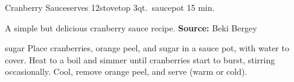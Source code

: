 \begin{recipe}{Cranberry Sauce}{serves 12}{stovetop \hfill 3qt.\ saucepot \hfill 15 min.}

 \freeform A simple but delicious cranberry sauce recipe.
 \textbf{Source:} Beki Bergey

  {sugar}
 Place cranberries, orange peel, and sugar in a sauce pot, with water to cover.
 \newstep Heat to a boil and simmer until cranberries start to burst, stirring occasionally.
 \newstep Cool, remove orange peel, and serve (warm or cold).

\end{recipe}
